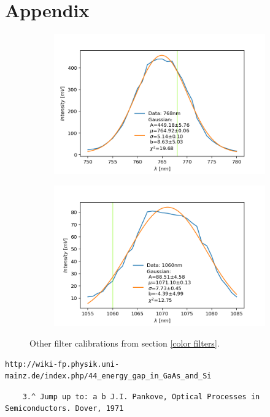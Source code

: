 \documentclass[]{article}
\begin{document}
\section{Appendix} \label{Appendix}
\begin{figure}[H]
\centering
\begin{subfigure}[b]{0.9\textwidth}
\includegraphics[width=\textwidth]{Plots/768nm-Filter.png}
\end{subfigure}
\begin{subfigure}[b]{0.9\textwidth}
\includegraphics[width=\textwidth]{Plots/1060nm-Filter.png}
\end{subfigure}
\caption{Other filter calibrations from section \ref{color filters}. }
\end{figure}




\newpage
\begin{thebibliography}{}

 \begin{verbatim}
http://wiki-fp.physik.uni-mainz.de/index.php/44_energy_gap_in_GaAs_and_Si
\end{verbatim} 
\begin{verbatim}
	3.^ Jump up to: a b J.I. Pankove, Optical Processes in Semiconductors. Dover, 1971
\end{verbatim}



\end{thebibliography}
\end{document}
